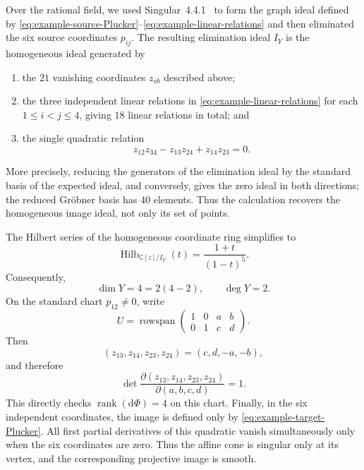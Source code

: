 \documentclass{siamonline250211}
\newcommand{\CC}{\mathbb C}
\newcommand{\rank}{\operatorname{rank}}
\newcommand{\dd}{\mathrm d}
\begin{document}
Over the rational field, we used Singular~4.4.1~\cite{Singular441} to form
the graph ideal defined by
\eqref{eq:example-source-Plucker}--\eqref{eq:example-linear-relations} and
then eliminated the six source coordinates $p_{ij}$. The resulting elimination
ideal $I_Y$ is the homogeneous ideal generated by
\begin{enumerate}[label=\textnormal{(\roman*)},leftmargin=2.8em]
  \item the $21$ vanishing coordinates $z_{ab}$ described above;
  \item the three independent linear relations in
        \eqref{eq:example-linear-relations} for each
        $1\leq i<j\leq4$, giving $18$ linear relations in total; and
  \item the single quadratic relation
  \begin{equation}\label{eq:example-target-Plucker}
    z_{12}z_{34}-z_{13}z_{24}+z_{14}z_{23}=0.
  \end{equation}
\end{enumerate}
More precisely, reducing the generators of the elimination ideal by the
standard basis of the expected ideal, and conversely, gives the zero ideal in
both directions; the reduced Gr\"obner basis has $40$ elements. Thus the
calculation recovers the homogeneous image ideal, not only its set of points.

The Hilbert series of the homogeneous coordinate ring simplifies to
\begin{equation}\label{eq:example-Hilbert-series}
  \operatorname{Hilb}_{\CC[z]/I_Y}(t)
  =\frac{1+t}{(1-t)^5}.
\end{equation}
Consequently,
\[
  \dim Y=4=2(4-2),\qquad \deg Y=2.
\]
On the standard chart $p_{12}\neq0$, write
\[
  U=\operatorname{rowspan}
  \begin{pmatrix}
    1&0&a&b\\
    0&1&c&d
  \end{pmatrix}.
\]
Then
\[
  (z_{13},z_{14},z_{23},z_{24})=(c,d,-a,-b),
\]
and therefore
\begin{equation}\label{eq:example-chart-Jacobian}
  \det\frac{\partial(z_{13},z_{14},z_{23},z_{24})}
  {\partial(a,b,c,d)}=1.
\end{equation}
This directly checks $\rank(\dd\Phi)=4$ on this chart. Finally, in the six
independent coordinates, the image is defined only by
\eqref{eq:example-target-Plucker}. All first partial derivatives of this
quadratic vanish simultaneously only when the six coordinates are zero.
Thus the affine cone is singular only at its vertex, and the corresponding
projective image is smooth.
\end{document}
